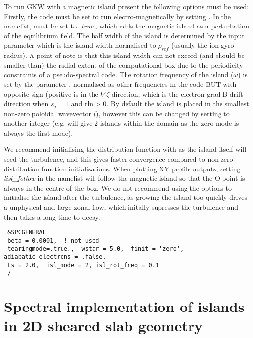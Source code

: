 To run GKW with a magnetic island present the following options must be used:  Firstly, the code must be set to run electro-magnetically by setting .  In the  namelist,  must be set to {\it .true.}, which adds the magnetic island as a perturbation of the equilibrium field.  The half width of the island is determined by the input parameter  which is the island width normalised to $\rho_{ref}$ (usually the ion gyro-radius).  A point of note is that this island width can not exceed (and should be smaller than) the radial extent of the computational box due to the periodicity constraints of a pseudo-spectral code. The rotation frequency of the island ($\omega$) is set by the parameter , normalised as other frequencies in the code BUT with opposite sign (positive is in the $\nabla \zeta$ direction, which is the electron grad-B drift direction when $s_j = 1$ and rln > 0.  By default the island is placed in the smallest non-zero poloidal wavevector (), however this can be changed by setting  to another integer (e.g.  will give 2 islands within the domain as the zero mode is always the first mode).

We recommend initialising the distribution function with  as the island itself will seed the turbulence, and this gives faster convergence compared to non-zero distribution function initialisations.  When plotting XY profile outputs, setting {\it lisl_follow} in the  namelist will follow the magnetic island so that the O-point is always in the centre of the box.  We do not recommend using the options to initialise the island after the turbulence, as growing the island too quickly drives a unphysical and large zonal flow, which initally supresses the turbulence and then takes a long time to decay.

\begin{small}
\begin{verbatim}
 &SPCGENERAL
 beta = 0.0001,  ! not used
 tearingmode=.true.,  wstar = 5.0,  finit = 'zero',  adiabatic_electrons = .false.
 Ls = 2.0,  isl_mode = 2, isl_rot_freq = 0.1   
 /
\end{verbatim}
\end{small}

\section{Spectral implementation of islands in 2D sheared slab geometry}

